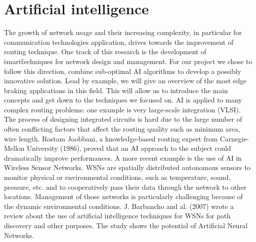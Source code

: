 \section{Artificial intelligence}
\bigbreak
The growth of network usage and their increasing complexity, in particular for communication 
technologies application, drives towards the improvement of routing technique. One track of this 
research is the development of \"smart\" techniques for network design and management.
\bigbreak
For our project we chose to follow this direction, combine sub-optimal AI algorithms to develop a 
possibly innovative solution. Lead by example, we will give an overview of the most edge braking 
applications in this field. This will allow us to introduce the main concepts and get down to the 
techniques we focused on.
\bigbreak
AI is applied to many complex routing problems: one example is very large-scale integration (VLSI). 
The process of designing integrated circuits is hard due to the large number of often conflicting 
factors that affect the routing quality such as minimum area, wire length. Rostam Joobbani, a 
knowledge-based routing expert from Carnegie-Mellon University (1986), proved that an AI approach 
to the subject could dramatically improve performances. 
\bigbreak
A more recent example is the use of AI in Wireless Sensor Networks. WSNs are spatially distributed 
autonomous sensors to monitor physical or environmental conditions, such as temperature, sound, 
pressure, etc. and to cooperatively pass their data through the network to other locations. Management
 of those networks is particularly challenging because of the dynamic environmental conditions. 
J. Barbancho and al. (2007) wrote a review about the use of artificial intelligence techniques for 
WSNs for path discovery and other purposes. The study shows the potential of Artificial Neural Networks. 

